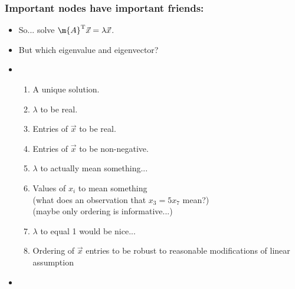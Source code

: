 \begin{frame}
  \frametitle{Important nodes have important friends:}

  \begin{itemize}
  \item<1->
    So...  solve $\m{A}^{\textnormal{T}} \vec{x} = \lambda \vec{x}$.
  \item<2->
    But which eigenvalue and eigenvector?
  \item<3->
    \begin{enumerate}
    \item<4->
      A unique solution. 
    \item<5->
      $\lambda$ to be real. 
    \item<6->
      Entries of $\vec{x}$ to be real. 
    \item<7->
      Entries of $\vec{x}$ to be non-negative. 
    \item<8->
      $\lambda$ to actually mean something...  
    \item<9->
      Values of $x_i$ to mean something\\
      (what does an observation that $x_3 = 5 x_7$ mean?)\\
      (maybe only ordering is informative...)\\
    \item<10->
      $\lambda$ to equal 1 would be nice...
    \item<11->
      Ordering of $\vec{x}$ entries to be robust
      to reasonable modifications of linear assumption
    \end{enumerate}
  \item<13->
  \end{itemize}

\end{frame}



